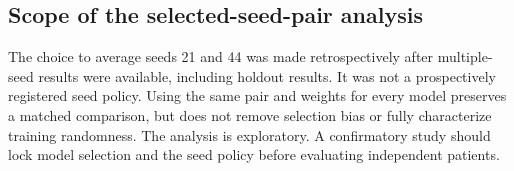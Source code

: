 \subsection{Scope of the selected-seed-pair analysis}
The choice to average seeds 21 and 44 was made retrospectively after multiple-seed results were available, including holdout results. It was not a prospectively registered seed policy. Using the same pair and weights for every model preserves a matched comparison, but does not remove selection bias or fully characterize training randomness. The analysis is exploratory. A confirmatory study should lock model selection and the seed policy before evaluating independent patients.

